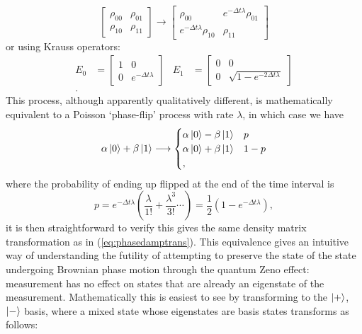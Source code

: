 \documentclass{report}
\begin{document}
\begin{appendices}
\begin{equation}
\begin{bmatrix}
        \rho_{00} & \rho_{01} \\ \rho_{10} & \rho_{11}
    \end{bmatrix}
    \longrightarrow
    \begin{bmatrix}
        \rho_{00} & e^{-\Delta t \lambda} \rho_{01} \\ e^{-\Delta t \lambda} \rho_{10} & \rho_{11}
    \end{bmatrix}
\end{equation} or using Krauss operators:
\begin{align*}
E_0 &= \begin{bmatrix}
1 & 0\\
0 & e^{-\Delta t \lambda}
\end{bmatrix}   &   E_1 &= \begin{bmatrix}
0 & 0\\
0 & \sqrt{1-e^{-2\Delta t \lambda}}
\end{bmatrix}\\.
\end{align*}
This process, although apparently qualitatively different, is mathematically equivalent to a Poisson `phase-flip' process with rate $\lambda$, in which case we have
\begin{equation*}
\alpha\ket{0} + \beta\ket{1} \longrightarrow 
\begin{cases} 
      \alpha\ket{0} - \beta\ket{1} & p\\
      \alpha\ket{0} + \beta\ket{1} & 1-p\\,
   \end{cases}
\end{equation*} where the probability of ending up flipped at the end of the time interval is
\begin{equation}\label{eq:p_def}
    p = e^{-\Delta t \lambda}\left(\frac{\lambda}{1!} + \frac{\lambda^3}{3!} \cdots\right) = \frac{1}{2}(1-e^{-\Delta t \lambda}),
\end{equation}
it is then straightforward to verify this gives the same density matrix transformation as in (\ref{eq:phasedamptrans}). This equivalence gives an intuitive way of understanding the futility of attempting to preserve the state of the state undergoing Brownian phase motion through the quantum Zeno effect: measurement has no effect on states that are already an eigenstate of the measurement. Mathematically this is easiest to see by transforming to the $\ket{+}$, $\ket{-}$ basis, where a mixed state whose eigenstates are basis states transforms as follows:
\begin{align*}

\end{align*}
\end{appendices}
\end{document}
